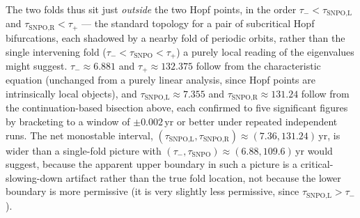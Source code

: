 \documentclass[twocolumn,10pt]{article}
\begin{document}
The two folds thus sit just \emph{outside} the two Hopf points, in the order $\tau_{-}<\tau_{\text{SNPO,L}}$ and $\tau_{\text{SNPO,R}}<\tau_{+}$ — the standard topology for a pair of subcritical Hopf bifurcations, each shadowed by a nearby fold of periodic orbits, rather than the single intervening fold ($\tau_-<\tau_{\text{SNPO}}<\tau_+$) a purely local reading of the eigenvalues might suggest. $\tau_-\approx6.881$ and $\tau_+\approx132.375$ follow from the characteristic equation (unchanged from a purely linear analysis, since Hopf points are intrinsically local objects), and $\tau_{\text{SNPO,L}}\approx7.355$ and $\tau_{\text{SNPO,R}}\approx131.24$ follow from the continuation-based bisection above, each confirmed to five significant figures by bracketing to a window of $\pm 0.002$\,yr or better under repeated independent runs. The net monostable interval, $(\tau_{\text{SNPO,L}},\tau_{\text{SNPO,R}})\approx(7.36,131.24)$\,yr, is wider than a single-fold picture with $(\tau_-,\tau_{\text{SNPO}})\approx(6.88,109.6)$\,yr would suggest, because the apparent upper boundary in such a picture is a critical-slowing-down artifact rather than the true fold location, not because the lower boundary is more permissive (it is very slightly less permissive, since $\tau_{\text{SNPO,L}}>\tau_-$).
\end{document}
